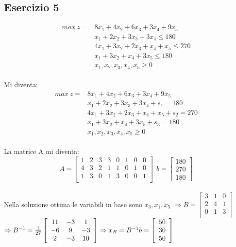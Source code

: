 \documentclass[12pt,a4paper]{article}
\begin{document}
\subsection{Esercizio 5}
$$\begin{array}{cl}
max \ z = & 8x_1+4x_2+6x_3+3x_4+9x_5\\
 & x_1+2x_2+3x_3+3x_4 \leq 180\\
 & 4x_1+3x_2+2x_3+x_4+x_5 \leq 270\\
 & x_1+3x_2+x_4+3x_5 \leq 180\\
 & x_1,x_2, x_3,x_4,x_5 \geq 0
 \end{array}$$\\
Mi diventa:
$$\begin{array}{cl}
max \ z = & 8x_1+4x_2+6x_3+3x_4+9x_5\\
 & x_1+2x_2+3x_3+3x_4 + s_1 = 180\\
 & 4x_1+3x_2+2x_3+x_4+x_5 + s_2 = 270\\
 & x_1+3x_2+x_4+3x_5 + s_3 =  180\\
 & x_1,x_2, x_3,x_4,x_5 \geq 0
 \end{array}$$\\
 La matrice A mi diventa:
 $$A=\left[\begin{array}{cccccccc}
 1&2&3&3&0&1&0&0\\
 4&3&2&1&1&0&1&0\\
 1&3&0&1&3&0&0&1\\
 \end{array}\right] \ \ b=\left[\begin{array}{c}180\\270\\180\end{array}\right]$$\\
 Nella soluzione ottima le variabili in base sono $x_3,x_1,x_5$
 $\Rightarrow B=\left[\begin{array}{ccc}
 3&1&0\\
 2&4&1\\
 0&1&3\\
 \end{array}\right]$\\
 $\Rightarrow B^{-1} = {1\over27}\left[\begin{array}{ccc}
 11&-3&1\\
 -6&9&-3\\
 2&-3&10\\
 \end{array}\right] \Rightarrow x_B = B^{-1}b = \left[\begin{array}{c}50\\ 30 \\50\end{array}\right]$
 
\end{document}
